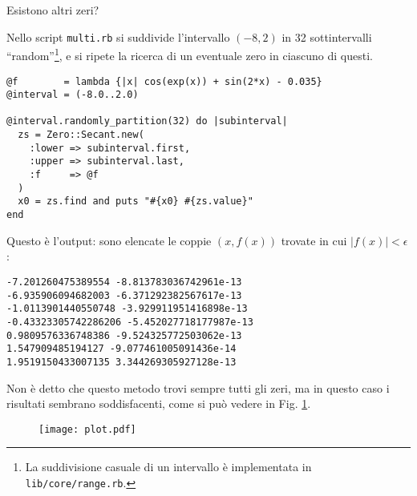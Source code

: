 \documentclass[a4paper]{article}
\begin{document}
Esistono altri zeri?

Nello script \texttt{multi.rb} si suddivide l'intervallo $(-8, 2)$ 
in 32 sottintervalli ``random''\footnote{La suddivisione casuale di un intervallo è implementata in \texttt{lib/core/range.rb}.}, 
e si ripete la ricerca di un eventuale
zero in ciascuno di questi.
\begin{lstlisting}
@f        = lambda {|x| cos(exp(x)) + sin(2*x) - 0.035}
@interval = (-8.0..2.0)

@interval.randomly_partition(32) do |subinterval|
  zs = Zero::Secant.new(
    :lower => subinterval.first,
    :upper => subinterval.last,
    :f     => @f
  )
  x0 = zs.find and puts "#{x0} #{zs.value}"
end
\end{lstlisting}

Questo è l'output: sono elencate le coppie $\left(x, f(x)\right)$ trovate in cui 
$|f(x)| < \epsilon$:
\begin{lstlisting}
-7.201260475389554 -8.813783036742961e-13
-6.935906094682003 -6.371292382567617e-13
-1.0113901440550748 -3.929911951416898e-13
-0.43323305742286206 -5.452027718177987e-13
0.9809576336748386 -9.524325772503062e-13
1.547909485194127 -9.077461005091436e-14
1.9519150433007135 3.344269305927128e-13
\end{lstlisting}

Non è detto che questo metodo trovi sempre tutti gli zeri, ma in questo
caso i risultati sembrano soddisfacenti, come si può vedere in 
Fig. \ref{fig:plot}.

\begin{center}
  \begin{figure}

    \begin{center}
      \texttt{[image: plot.pdf]}
    \end{center}

    \caption{  }
    
    \label{fig:plot}
    
  \end{figure}
\end{center}
\end{document}
